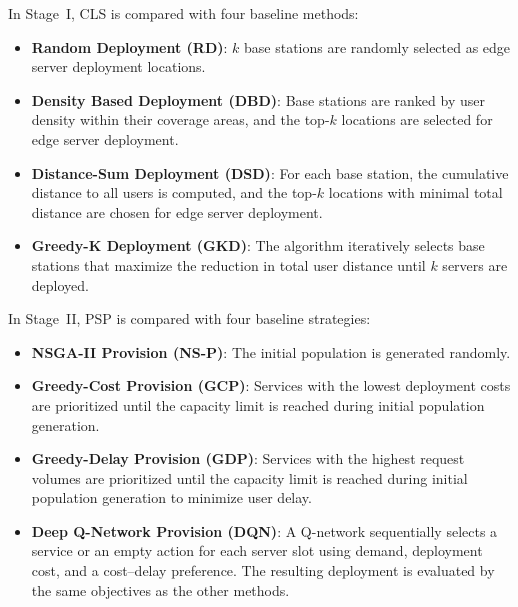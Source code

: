 \documentclass[10pt, conference, letterpaper]{IEEEtran}
\begin{document}

In Stage~I, CLS is compared with four baseline methods:
\begin{itemize}
    \item \textbf{Random Deployment (RD)}: $k$ base stations are randomly selected as edge server deployment locations.
    \item \textbf{Density Based Deployment (DBD)}: Base stations are ranked by user density within their coverage areas, and the top-$k$ locations are selected for edge server deployment.
    \item \textbf{Distance-Sum Deployment (DSD)}: For each base station, the cumulative distance to all users is computed, and the top-$k$ locations with minimal total distance are chosen for edge server deployment.
    \item \textbf{Greedy-K Deployment (GKD)}: The algorithm iteratively selects base stations that maximize the reduction in total user distance until $k$ servers are deployed.
\end{itemize}


In Stage~II, PSP is compared with four baseline strategies:

\begin{itemize}
    \item \textbf{NSGA-II Provision (NS-P)}: The initial population is generated randomly.
    \item \textbf{Greedy-Cost Provision (GCP)}: Services with the lowest deployment costs are prioritized until the capacity limit is reached during initial population generation.
    \item \textbf{Greedy-Delay Provision (GDP)}: Services with the highest request volumes are prioritized until the capacity limit is reached during initial population generation to minimize user delay.
    \item \textbf{Deep Q-Network Provision (DQN)}: A Q-network sequentially selects a service or an empty action for each server slot using demand, deployment cost, and a cost--delay preference. The resulting deployment is evaluated by the same objectives as the other methods.
\end{itemize}
\end{document}
